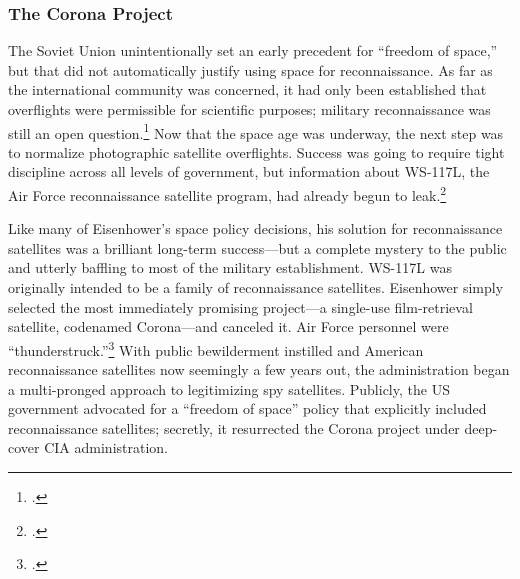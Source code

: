 \documentclass[14pt]{extarticle}
\begin{document}
\subsubsection{The Corona Project}
The Soviet Union unintentionally set an early precedent for ``freedom of space,'' but that did not automatically justify using space for reconnaissance. As far as the international community was concerned, it had only been established that overflights were permissible for scientific purposes; military reconnaissance was still an open question.\footcite[p.~47-48]{peebles_corona_1997} Now that the space age was underway, the next step was to normalize photographic satellite overflights. Success was going to require tight discipline across all levels of government, but information about WS-117L, the Air Force reconnaissance satellite program, had already begun to leak.\footcite[p.~96]{lindgren_trust_2000}

Like many of Eisenhower's space policy decisions, his solution for reconnaissance satellites was a brilliant long-term success---but a complete mystery to the public and utterly baffling to most of the military establishment. WS-117L was originally intended to be a family of reconnaissance satellites. Eisenhower simply selected the most immediately promising project---a single-use film-retrieval satellite, codenamed Corona---and canceled it. Air Force personnel were ``thunderstruck.''\footcite[p.~45]{peebles_corona_1997} With public bewilderment instilled and American reconnaissance satellites now seemingly a few years out, the administration began a multi-pronged approach to legitimizing spy satellites. Publicly, the US government advocated for a ``freedom of space'' policy that explicitly included reconnaissance satellites; secretly, it resurrected the Corona project under deep-cover CIA administration.
\end{document}
